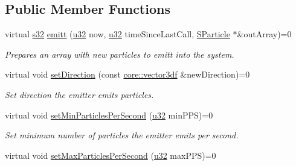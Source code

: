 \subsection*{Public Member Functions}
\begin{DoxyCompactItemize}
\item 
virtual \hyperlink{namespaceirr_ac66849b7a6ed16e30ebede579f9b47c6}{s32} \hyperlink{classirr_1_1scene_1_1IParticleEmitter_aaf773f8ce5db3b5a2455561ef7818506}{emitt} (\hyperlink{namespaceirr_a0416a53257075833e7002efd0a18e804}{u32} now, \hyperlink{namespaceirr_a0416a53257075833e7002efd0a18e804}{u32} time\+Since\+Last\+Call, \hyperlink{structirr_1_1scene_1_1SParticle}{S\+Particle} $\ast$\&out\+Array)=0
\begin{DoxyCompactList}\small\item\em Prepares an array with new particles to emitt into the system. \end{DoxyCompactList}\item 
\mbox{\label{classirr_1_1scene_1_1IParticleEmitter_abb433f4f96ad468c0314138743ae1044}} 
virtual void \hyperlink{classirr_1_1scene_1_1IParticleEmitter_abb433f4f96ad468c0314138743ae1044}{set\+Direction} (const \hyperlink{namespaceirr_1_1core_a06f169d08b5c429f5575acb7edbad811}{core\+::vector3df} \&new\+Direction)=0
\begin{DoxyCompactList}\small\item\em Set direction the emitter emits particles. \end{DoxyCompactList}\item 
\mbox{\label{classirr_1_1scene_1_1IParticleEmitter_af27d98a4e0251467238c10e2cc4fad0b}} 
virtual void \hyperlink{classirr_1_1scene_1_1IParticleEmitter_af27d98a4e0251467238c10e2cc4fad0b}{set\+Min\+Particles\+Per\+Second} (\hyperlink{namespaceirr_a0416a53257075833e7002efd0a18e804}{u32} min\+P\+PS)=0
\begin{DoxyCompactList}\small\item\em Set minimum number of particles the emitter emits per second. \end{DoxyCompactList}\item 
\mbox{\label{classirr_1_1scene_1_1IParticleEmitter_aba42268e14a02e3d97c88599ab82f881}} 
virtual void \hyperlink{classirr_1_1scene_1_1IParticleEmitter_aba42268e14a02e3d97c88599ab82f881}{set\+Max\+Particles\+Per\+Second} (\hyperlink{namespaceirr_a0416a53257075833e7002efd0a18e804}{u32} max\+P\+PS)=0

\end{DoxyCompactItemize}
